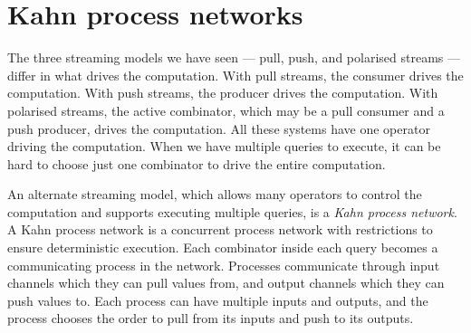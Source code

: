 % 
% 
% 
% 
% 

\section{Kahn process networks}
\label{taxonomy/kpn}

The three streaming models we have seen --- pull, push, and polarised streams --- differ in what drives the computation.
With pull streams, the consumer drives the computation.
With push streams, the producer drives the computation.
With polarised streams, the active combinator, which may be a pull consumer and a push producer, drives the computation.
All these systems have one operator driving the computation.
When we have multiple queries to execute, it can be hard to choose just one combinator to drive the entire computation.

An alternate streaming model, which allows many operators to control the computation and supports executing multiple queries, is a \emph{Kahn process network}.
A Kahn process network is a concurrent process network with restrictions to ensure deterministic execution.
Each combinator inside each query becomes a communicating process in the network.
Processes communicate through input channels which they can pull values from, and output channels which they can push values to.
Each process can have multiple inputs and outputs, and the process chooses the order to pull from its inputs and push to its outputs.

